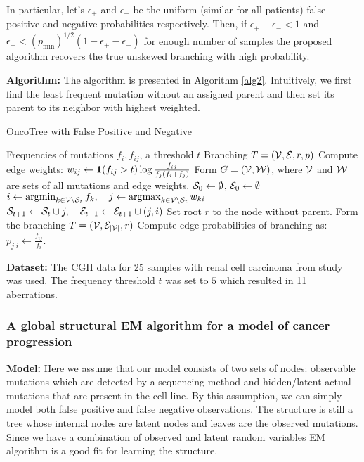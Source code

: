 	In particular, let's $\epsilon_+$ and $\epsilon_-$ be the uniform (similar for all patients) false positive and negative probabilities respectively. 
	Then, if $\epsilon_+ + \epsilon_- < 1$ and $\epsilon_+ < (p_{\min})^{1/2} (1 - \epsilon_+ - \epsilon_-)$ for enough number of samples the proposed algorithm recovers the true unskewed branching with high probability.	
	
	{\bf Algorithm:}
	The algorithm is presented in Algorithm \ref{alg2}. 
	Intuitively, we first find the least frequent mutation without an assigned parent and then set its parent to its neighbor with highest weighted.  
	
	\begin{algorithm}[t]
		\caption{OncoTree with False Positive and Negative}
		\label{alg2}
		\begin{algorithmic}[1]
			 Frequencies of mutations $f_i, f_{ij}$, a threshold $t$
			 Branching $T = ({\cal V}, {\cal E}, r, p)$
			\STATE Compute edge weights: $w_{ij} \leftarrow {\large \bf 1}(f_{ij} > t) \log \frac{f_{ij}}{f_j(f_i + f_j)}$
			\STATE Form $G = ({\cal V}, {\cal W})$, where ${\cal V}$ and ${\cal W}$ are sets of all mutations and edge weights.
			\STATE ${\cal S}_0 \leftarrow \emptyset$, ${\cal E}_0 \leftarrow \emptyset$
			\STATE $i \leftarrow \operatorname*{\arg\!\min}_{k \in {\cal V} \setminus {\cal S}_t} f_k, \quad j \leftarrow \operatorname*{\arg\!\max}_{k \in {\cal V} \setminus {\cal S}_t} w_{ki}$
			\STATE ${\cal S}_{t+1} \leftarrow {\cal S}_t \cup {j}, \quad {\cal E}_{t+1} \leftarrow {\cal E}_{t+1} \cup {(j, i)} $
			\ENDFOR 
			\STATE Set root $r$ to the node without parent.
			\STATE Form the branching $T = ({\cal V}, {\cal E}_{|{\cal V}|}, r)$
			\STATE Compute edge probabilities of branching as:  $p_{j|i} \leftarrow \frac{f_{ij}}{f_i}$.
		\end{algorithmic}
	\end{algorithm}
	
	
	{\bf Dataset:} 
	The CGH \cite{kallioniemi92} data for 25 samples with renal cell carcinoma from \cite{jiang98} study was used. 
	The frequency threshold $t$ was set to $5$ which resulted in 11 aberrations. 

	
	\subsubsection{A global structural EM algorithm for a model of cancer progression \cite{tofigh11}}
	{\bf Model:} Here we assume that our model consists of two sets of nodes: observable mutations which are detected by a sequencing method and hidden/latent actual mutations that are present in the cell line. By this assumption, we can simply model both false positive and false negative observations. The structure is still a tree whose internal nodes are latent nodes and leaves are the observed mutations. Since we have a combination of observed and latent random variables EM algorithm is a good fit for learning the structure. 
	
